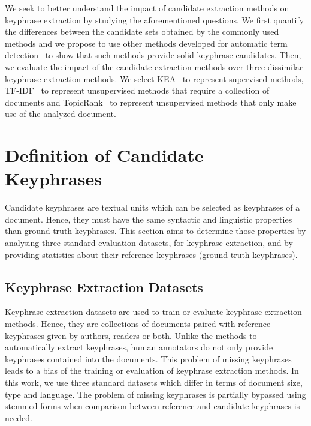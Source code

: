   We seek to better understand the impact of candidate extraction methods on
  keyphrase extraction by studying the aforementioned questions. We first
  quantify the differences between the candidate sets obtained by the commonly
  used methods and we propose to use other methods developed for automatic term
  detection~\cite{castellvi2001automatictermdetection,evans1996nounphraseanalysis}
  to show that such methods provide solid keyphrase candidates. Then, we
  evaluate the impact of the candidate extraction methods over three dissimilar
  keyphrase extraction methods. We select KEA~\cite{witten1999kea} to represent
  supervised methods, TF-IDF~\cite{jones1972tfidf} to represent unsupervised
  methods that require a collection of documents and
  TopicRank~\cite{bougouin2013topicrank} to represent unsupervised methods that
  only make use of the analyzed document.


\section{Definition of Candidate Keyphrases}
\label{sec:study_of_ground_truth_keyphrases}
  Candidate keyphrases are textual units which can be selected as keyphrases
  of a document. Hence, they must have the same syntactic and linguistic
  properties than ground truth keyphrases. This section aims to determine those
  properties by analysing three standard evaluation datasets, for keyphrase
  extraction, and by providing statistics about their reference keyphrases
  (ground truth keyphrases).

  \subsection{Keyphrase Extraction Datasets}
  \label{subsec:keyphrase_extraction_datasets}
    Keyphrase extraction datasets are used to train or evaluate keyphrase
    extraction methods. Hence, they are collections of documents paired with
    reference keyphrases given by authors, readers or both. Unlike the methods
    to automatically extract keyphrases, human annotators do not only provide
    keyphrases contained into the documents. This problem of missing keyphrases
    leads to a bias of the training or evaluation of keyphrase extraction
    methods. In this work, we use three standard datasets which differ in terms
    of document size,  type and language. The problem of missing keyphrases is
    partially bypassed using stemmed forms when comparison between reference and
    candidate keyphrases is needed.

